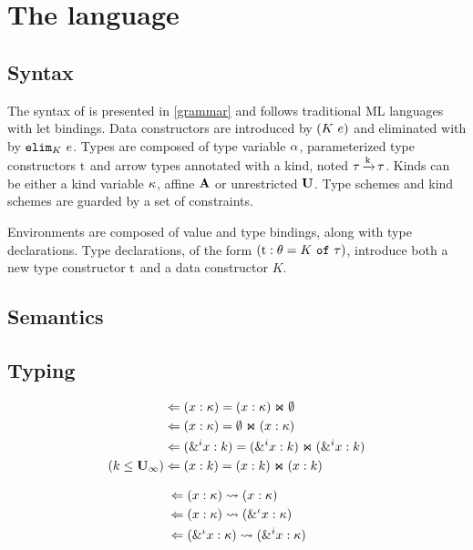 \section{The \lang language}

\subsection{Syntax}

The syntax of \lang is presented in \cref{grammar} and follows
traditional ML languages with let bindings.
Data constructors are introduced by $\introK{K}{e}$ and eliminated
with by $\elimK{K}{e}$.
Types are composed of type variable $\tvar$, parameterized type constructors
$\T{t}$ and arrow types annotated with a kind, noted $\tau \tarr{k} \tau$.
Kinds can be either a kind variable $\kvar$, affine $\kaff$ or unrestricted $\kun$.
Type schemes and kind schemes are guarded by a set of constraints.

Environments are composed of value and type bindings, along with type
declarations. Type declarations, of the form
$\tydecl{t}{\kschm}{K}{\tau}$, introduce both a new type constructor $\T{t}$ and
a data constructor $K$.

\begin{figure*}[t]
  \centering
  
  \caption{Syntax}
  \label{grammar}
\end{figure*}

\subsection{Semantics}



\subsection{Typing}


\begin{figure*}[!h]
  \centering
  \begin{align*}
    \tsplit{&}{\bvar{x}{\kvar}}{\bvar{x}{\kvar}}{\Cempty}\\
    \tsplit{&}{\bvar{x}{\kvar}}{\Cempty}{\bvar{x}{\kvar}}\\
    \tsplit{&}{\bvar{\borrow[i]{x}}{k}}
              {\bvar{\borrow[i]{x}}{k}}{\bvar{\borrow[i]{x}}{k}}\\
    \tsplit{\Cleq{k}{\kun_\infty}&}{\bvar{x}{k}}{\bvar{x}{k}}{\bvar{x}{k}}
  \end{align*}
  \caption{Type splitting}
  \label{typesplit}
  \begin{align*}
    \tregion{&}{\bvar{x}{\kvar}}{\bvar{x}{\kvar}}\\
    \tregion{&}{\bvar{x}{\kvar}}{\bvar{\borrow{x}}{\kvar}}\\
    \tregion{&}{\bvar{\borrow{x}}{\kvar}}{\bvar{\borrow[i]{x}}{\kvar}}
  \end{align*}
  \caption{Borrowing}
  \label{typesplit}
\end{figure*}

